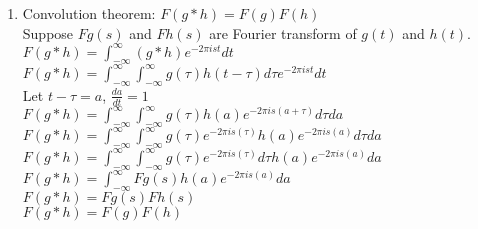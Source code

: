 \documentclass[11pt]{article}
\begin{document}
\begin{enumerate}
\begin{enumerate}
	\item Convolution theorem: $F(g*h)=F(g)F(h)$\\
	Suppose $Fg(s)$ and $Fh(s)$ are Fourier transform of $g(t)$ and $h(t).$\\
	$F(g*h)=\int_{-\infty}^{\infty}(g*h)e^{-2\pi ist}dt$\\
	$F(g*h)=\int_{-\infty}^{\infty}\int_{-\infty}^{\infty}g(\tau)h(t-\tau)d\tau e^{-2\pi ist}dt$\\
	Let $t-\tau=a$, $\frac{da}{dt}=1$\\
	$F(g*h)=\int_{-\infty}^{\infty}\int_{-\infty}^{\infty}g(\tau)h(a)e^{-2\pi is(a+\tau)}d\tau da$\\
	$F(g*h)=\int_{-\infty}^{\infty}\int_{-\infty}^{\infty}g(\tau)e^{-2\pi is(\tau)}h(a)e^{-2\pi is(a)}d\tau da$\\
	$F(g*h)=\int_{-\infty}^{\infty}\int_{-\infty}^{\infty}g(\tau)e^{-2\pi is(\tau)}d\tau h(a)e^{-2\pi is(a)}da$\\
	$F(g*h)=\int_{-\infty}^{\infty}Fg(s)h(a)e^{-2\pi is(a)}da$\\
	$F(g*h)=Fg(s)Fh(s)$\\
	$F(g*h)=F(g)F(h)$\\
	
\end{enumerate} 



\end{enumerate}
\end{document}
